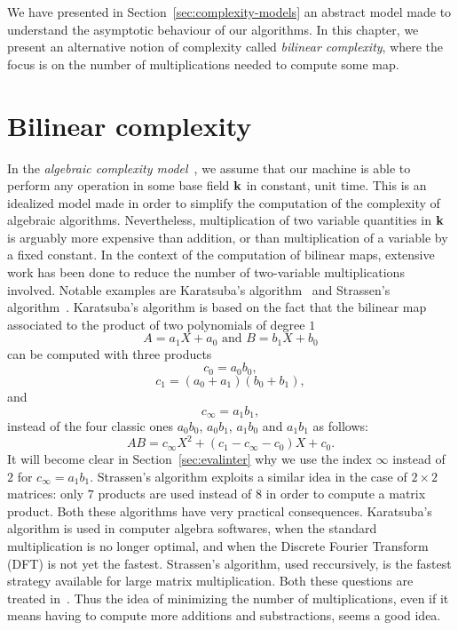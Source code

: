 We have presented in Section~\ref{sec:complexity-models} an abstract model made
to understand the asymptotic behaviour of our algorithms. In this chapter, we
present an alternative notion of complexity called \emph{bilinear complexity},
where the focus is on the number of multiplications needed to compute some map.
\minitoc

\section{Bilinear complexity}

In the \emph{algebraic complexity model}~\cite{BCS13}, we assume that our
machine is able to perform any operation in some base field $\mathbf{k}$ in constant,
unit time. This is an idealized model made in order to simplify the
computation of the complexity of algebraic algorithms. Nevertheless,
multiplication of two variable quantities in $\mathbf{k}$ is arguably more expensive
than addition, or than multiplication of a variable by a fixed constant. In the
context of the computation of bilinear maps, extensive work has been done to
reduce the number of two-variable multiplications involved. Notable examples are
Karatsuba's algorithm~\cite{Karatsuba63} and
Strassen's algorithm~\cite{Strassen69}. Karatsuba's algorithm is
based on the fact that the bilinear map associated to the product of two
polynomials of degree $1$
\[
  A = a_1 X + a_0\text{ and }B = b_1 X + b_0
\]
can be computed with three products
\[
  c_0 = a_0b_0,
\]
\[
  c_1 = (a_0+a_1)(b_0+b_1),
\]
and
\[
  c_\infty = a_1b_1,
\]
instead
of the four classic ones $a_0b_0$, $a_0b_1$, $a_1b_0$ and $a_1b_1$ as follows:
\[
  AB = c_\infty X^2 + (c_1-c_\infty-c_0) X + c_0.
\]
It will become clear in Section~\ref{sec:evalinter} why we use the index
$\infty$ instead of $2$ for $c_\infty = a_1b_1$. Strassen's algorithm
exploits a similar idea in the case of $2\times2$ matrices: only $7$ products
are used instead of $8$ in order to compute a matrix product. Both these
algorithms have very practical consequences. Karatsuba's algorithm is used in
computer algebra softwares, when the standard multiplication is no longer
optimal, and when the Discrete Fourier Transform (DFT) is not yet the fastest.
Strassen's algorithm, used reccursively, is the fastest strategy available for
large matrix multiplication. Both these questions are treated in~\cite{GG13}.
Thus the idea of minimizing the number of multiplications, even if it means
having to compute more additions and substractions, seems a good idea.

